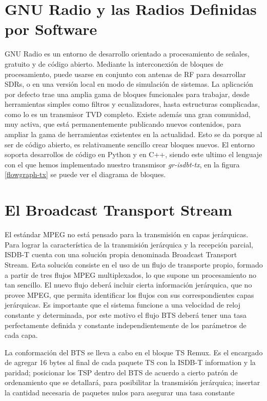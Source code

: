 \documentclass[journal,comsoc]{IEEEtran}
\begin{document}
\section{GNU Radio y las Radios Definidas por Software}
GNU Radio es un entorno de desarrollo orientado a procesamiento de señales,
gratuito y de código abierto. Mediante la interconexión de bloques de procesamiento, puede usarse en conjunto con antenas de RF para desarrollar SDRs, o en una versión local en modo de simulación de sistemas. La aplicación por defecto trae una amplia gama de bloques funcionales para
trabajar, desde herramientas simples como filtros y ecualizadores, hasta estructuras complicadas, como lo es un transmisor TVD completo. Existe además una gran comunidad, muy activa, que está permanentemente publicando nuevos contenidos, para ampliar la gama de herramientas existentes en la actualidad. Esto se da porque al ser de código abierto, es relativamente sencillo crear bloques nuevos. El entorno soporta desarrollos de código en Python y en C++, siendo este ultimo el lenguaje con el que hemos implementado nuestro transmisor \textit{gr-isdbt-tx}, en la figura \ref{flowgraph-tx} se puede ver el diagrama de bloques. 

\section{El Broadcast Transport Stream}
El estándar MPEG no está pensado para la transmisión en capas jerárquicas.
Para lograr la característica de la transmisión jerárquica y la recepción parcial, ISDB-T cuenta con una solución propia denominada Broadcast Transport Stream. Esta solución consiste en el uso de un flujo de transporte propio, formado a partir de tres flujos MPEG multiplexados, lo que supone un procesamiento no tan sencillo. El nuevo flujo deberá incluir cierta información jerárquica, que no provee MPEG, que permita identificar los flujos con sus correspondientes capas jerárquicas. Es importante que el sistema funcione a una velocidad de reloj constante y determinada, por este motivo el flujo BTS deberá tener una tasa perfectamente definida y constante independientemente de los parámetros de cada capa. 

La conformación del BTS se lleva a cabo en el bloque TS Remux. Es el encargado de agregar 16 bytes al final de cada paquete TS con la ISDB-T information y la paridad; posicionar los TSP dentro del BTS de acuerdo a cierto patrón de ordenamiento que se detallará, para posibilitar la transmisión jerárquica; insertar la cantidad necesaria de paquetes nulos para asegurar una tasa constante 
\end{document}

